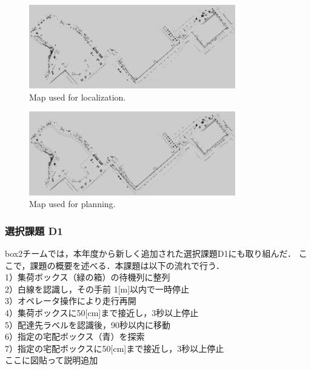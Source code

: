 \documentclass[twocolumn, 9pt]{jsproceedings}
\begin{document}
\begin{figure}[h!]
  \centering
  \includegraphics[width=90mm]{fig/map.pdf}
  \caption{Map used for localization.}
  \label{fig:map}
\end{figure}
\vspace*{-1mm}
\begin{figure}[h!]
  \centering
  \includegraphics[width=90mm]{fig/costmap.pdf}
  \caption{Map used for planning.}
  \label{fig:costmap}
\end{figure}





\subsubsection{選択課題 D1}
box2チームでは，本年度から新しく追加された選択課題D1にも取り組んだ．
ここで，課題の概要を述べる．本課題は以下の流れで行う．\\

\hspace*{-1zw}1）集荷ボックス（緑の箱）の待機列に整列\\
2）白線を認識し，その手前 1[m]以内で一時停止\\
3）オペレータ操作により走行再開\\
4）集荷ボックスに50[cm]まで接近し，3秒以上停止\\
5）配達先ラベルを認識後，90秒以内に移動\\
6）指定の宅配ボックス（青）を探索\\
7）指定の宅配ボックスに50[cm]まで接近し，3秒以上停止\\

ここに図貼って説明追加
\end{document}
